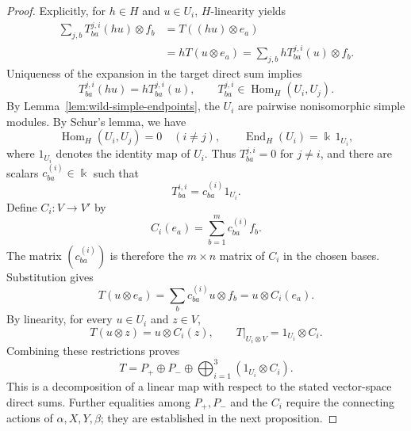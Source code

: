\documentclass[10pt,oneside]{amsart}
\newcommand{\kk}{\Bbbk}
\theoremstyle{definition}
\begin{document}
\begin{proof}
Explicitly, for $h\in H$ and $u\in U_i$, $H$-linearity yields
\begin{align*}
 \sum_{j,b}T^{j,i}_{ba}(hu)\otimes f_b
 &=T((hu)\otimes e_a)\\
 &=hT(u\otimes e_a)
 =\sum_{j,b}hT^{j,i}_{ba}(u)\otimes f_b.
\end{align*}
Uniqueness of the expansion in the target direct sum implies
\[
 T^{j,i}_{ba}(hu)=hT^{j,i}_{ba}(u),
 \qquad
 T^{j,i}_{ba}\in\operatorname{Hom}_H(U_i,U_j).
\]
By Lemma~\ref{lem:wild-simple-endpoints}, the $U_i$ are pairwise
nonisomorphic simple modules. By Schur's lemma, we have
\[
 \operatorname{Hom}_H(U_i,U_j)=0\quad(i\ne j),
 \qquad
 \operatorname{End}_H(U_i)=\kk\,1_{U_i},
\]
where $1_{U_i}$ denotes the identity map of $U_i$.
Thus $T^{j,i}_{ba}=0$ for $j\ne i$, and there are scalars
$c^{(i)}_{ba}\in\kk$ such that
\[
 T^{i,i}_{ba}=c^{(i)}_{ba}1_{U_i}.
\]
Define $C_i:V\to V'$ by
\[
 C_i(e_a)=\sum_{b=1}^m c^{(i)}_{ba}f_b.
\]
The matrix $(c^{(i)}_{ba})$ is therefore the $m\times n$ matrix of
$C_i$ in the chosen bases. Substitution gives
\[
 T(u\otimes e_a)
 =\sum_b c^{(i)}_{ba}u\otimes f_b
 =u\otimes C_i(e_a).
\]
By linearity, for every $u\in U_i$ and $z\in V$,
\[
 T(u\otimes z)=u\otimes C_i(z),
 \qquad
 T|_{U_i\otimes V}=1_{U_i}\otimes C_i.
\]
Combining these restrictions proves
\[
 T=P_+\oplus P_-\oplus
       \bigoplus_{i=1}^3(1_{U_i}\otimes C_i).
\]
This is a decomposition of a linear map with respect to the stated
vector-space direct sums. Further equalities among $P_+,P_-$ and
the $C_i$ require the connecting actions of $\alpha,X,Y,\beta$;
they are established in the next proposition.
\end{proof}
\end{document}
